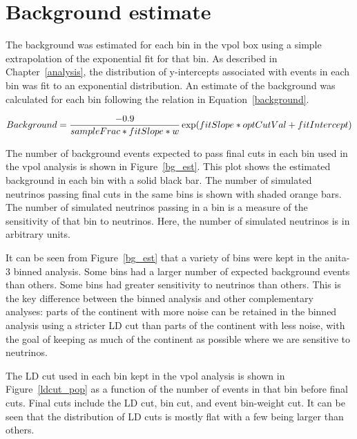 \section{Background estimate}

The background was estimated for each bin in the \gls{vpol} box using a simple extrapolation of the exponential fit for that bin. As described in Chapter~\ref{analysis}, the distribution of y-intercepts associated with events in each bin was fit to an exponential distribution. An estimate of the background was calculated for each bin following the relation in Equation~\ref{background}. 


\begin{equation*}
Background = \frac{-0.9}{sampleFrac * fitSlope * w}
\exp(fitSlope * optCutVal + fitIntercept) \\
\label{background}
\end{equation*}


The number of background events expected to pass final cuts in each bin used in the \gls{vpol} analysis is shown in Figure~\ref{bg_est}. This plot shows the estimated background in each bin with a solid black bar. The number of simulated neutrinos passing final cuts in the same bins is shown with shaded orange bars. The number of simulated neutrinos passing in a bin is a measure of the sensitivity of that bin to neutrinos. Here, the number of simulated neutrinos is in arbitrary units. 

It can be seen from Figure~\ref{bg_est} that a variety of bins were kept in the \gls{anita}-3 binned analysis. Some bins had a larger number of expected background events than others. Some bins had greater sensitivity to neutrinos than others. This is the key difference between the binned analysis and other complementary analyses: parts of the continent with more noise can be retained in the binned analysis using a stricter LD cut than parts of the continent with less noise, with the goal of keeping as much of the continent as possible where we are sensitive to neutrinos. 

The LD cut used in each bin kept in the \gls{vpol} analysis is shown in Figure~\ref{ldcut_pop} as a function of the number of events in that bin before final cuts. Final cuts include the LD cut, bin cut, and event bin-weight cut. It can be seen that the distribution of LD cuts is mostly flat with a few being larger than others. 


